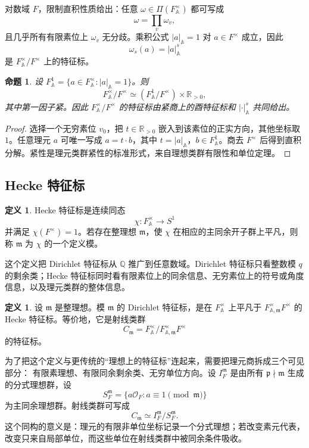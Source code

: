 \documentclass[11pt,a4paper,openany]{ctexbook}
\numberwithin{equation}{chapter}
\newcommand{\Q}{\mathbb{Q}}
\newcommand{\R}{\mathbb{R}}
\newcommand{\A}{\mathbb{A}}
\theoremstyle{plain}
\newtheorem{proposition}[theorem]{命题}
\theoremstyle{definition}
\newtheorem{definition}[theorem]{定义}
\theoremstyle{remark}
\begin{document}
对数域 $F$，限制直积性质给出：任意 $\omega\in\Pi(F_{\A}^{\times})$ 都可写成
\[
  \omega=\prod_v\omega_v,
\]
且几乎所有有限素位上 $\omega_v$ 无分歧。乘积公式 $|a|_{\A}=1$ 对 $a\in F^\times$ 成立，因此
\[
  \omega_s(a)=|a|_{\A}^s
\]
是 $F_{\A}^{\times}/F^\times$ 上的特征标。

\begin{proposition}
设 $F_{\A}^{1}=\{a\in F_{\A}^{\times}:|a|_{\A}=1\}$。则
\[
  F_{\A}^{\times}/F^\times\simeq (F_{\A}^{1}/F^\times)\times \R_{>0},
\]
其中第一因子紧。因此 $F_{\A}^{\times}/F^\times$ 的特征标由紧商上的酉特征标和 $|\cdot|_{\A}^s$ 共同给出。
\end{proposition}

\begin{proof}
选择一个无穷素位 $v_0$，把 $t\in\R_{>0}$ 嵌入到该素位的正实方向，其他坐标取 $1$。任意理元 $a$ 可唯一写成 $a=t\cdot b$，其中 $t=|a|_{\A}$，$b\in F_{\A}^{1}$。商去 $F^\times$ 后得到直积分解。紧性是理元类群紧性的标准形式，来自理想类群有限性和单位定理。
\end{proof}

\subsection{Hecke 特征标}

\begin{definition}
Hecke 特征标是连续同态
\[
  \chi:F_{\A}^{\times}\to S^1
\]
并满足 $\chi(F^\times)=1$。若存在整理想 $\mathfrak m$，使 $\chi$ 在相应的主同余开子群上平凡，则称 $\mathfrak m$ 为 $\chi$ 的一个定义模。
\end{definition}

这个定义把 Dirichlet 特征标从 $\Q$ 推广到任意数域。Dirichlet 特征标只看整数模 $q$ 的剩余类；Hecke 特征标同时看有限素位上的同余信息、无穷素位上的符号或角度信息，以及理元类群的整体信息。

\begin{definition}
设 $\mathfrak m$ 是整理想。模 $\mathfrak m$ 的 Dirichlet 特征标，是在 $F_{\A}^{\times}$ 上平凡于 $F_{\A,\mathfrak m}^{\times}F^\times$ 的 Hecke 特征标。等价地，它是射线类群
\[
  C_{\mathfrak m}=F_{\A}^{\times}/F_{\A,\mathfrak m}^{\times}F^\times
\]
的特征标。
\end{definition}

为了把这个定义与更传统的“理想上的特征标”连起来，需要把理元商拆成三个可见部分：
有限素理想、有限同余剩余类、无穷单位方向。设 $I_F^{\mathfrak m}$ 是由所有
$\mathfrak p\nmid\mathfrak m$ 生成的分式理想群，设
\[
  S_F^{\mathfrak m}=\{a\mathcal O_F:a\equiv 1\pmod{\mathfrak m}\}
\]
为主同余理想群。射线类群可写成
\[
  C_{\mathfrak m}\simeq I_F^{\mathfrak m}/S_F^{\mathfrak m}.
\]
这个同构的意义是：理元的有限非单位坐标记录一个分式理想；若改变素元代表，
改变只来自局部单位，而这些单位在射线类群中被同余条件吸收。
\end{document}
